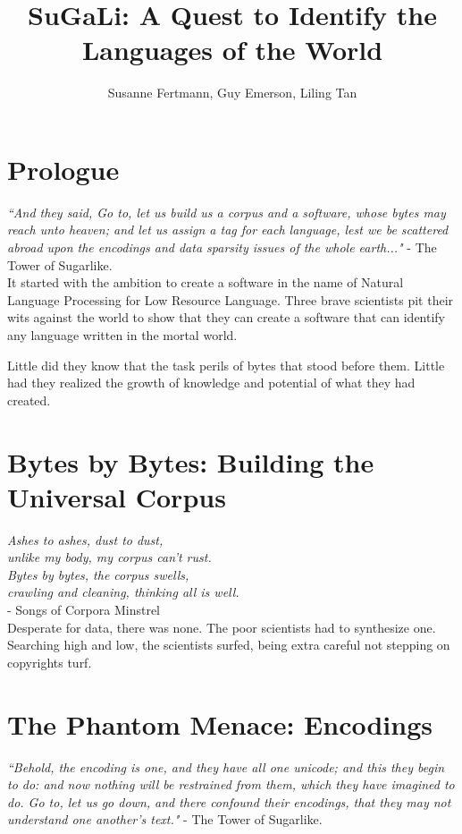 \documentclass[11pt]{article}
\title{\textbf{SuGaLi: A Quest to Identify the Languages of the World}}
\author{Susanne Fertmann, Guy Emerson, Liling Tan}
\date{}
\begin{document}
\maketitle

\section{Prologue}

\emph{``And they said, Go to, let us build us a corpus and a software, whose bytes may reach unto heaven; and let us assign a tag for each language, lest we be scattered abroad upon the encodings and data sparsity issues of the whole earth..."} - The Tower of Sugarlike. \\

\noindent It started with the ambition to create a software in the name of Natural Language Processing for Low Resource Language. Three brave scientists pit their wits against the world to show that they can create a software that can identify any language written in the mortal world. 

Little did they know that the task perils of bytes that stood before them. Little had they realized the growth of knowledge and potential of what they had created. 
\\

\noindent 

\newpage
\section{Bytes by Bytes: Building the Universal Corpus}

\emph{Ashes to ashes, dust to dust, \\
unlike my body, my corpus can't rust. \\
Bytes by bytes, the corpus swells, \\
crawling and cleaning, thinking all is well. \\}
- Songs of Corpora Minstrel \\

\noindent Desperate for data, there was none. The poor scientists had to synthesize one. Searching high and low, the scientists surfed, being extra careful not stepping on copyrights turf.

\section{The Phantom Menace: Encodings}
\emph{``Behold, the encoding is one, and they have all one unicode; and this they begin to do: and now nothing will be restrained from them, which they have imagined to do. Go to, let us go down, and there confound their encodings, that they may not understand one another's text."} - The Tower of Sugarlike.
\end{document}
